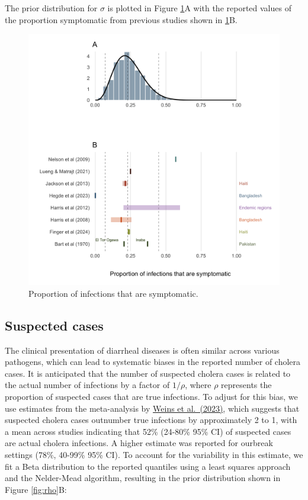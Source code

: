 \documentclass[
]{book}
\begin{document}
The prior distribution for \(\sigma\) is plotted in Figure \ref{fig:symptomatic-fig}A with the reported values of the proportion symptomatic from previous studies shown in \ref{fig:symptomatic-fig}B.

\begin{figure}

\includegraphics[width=1.03\linewidth]{figures/proportion_symptomatic} \hfill{}

\caption{Proportion of infections that are symptomatic.}\label{fig:symptomatic-fig}
\end{figure}

\subsection{Suspected cases}\label{suspected-cases}

The clinical presentation of diarrheal diseases is often similar across various pathogens, which can lead to systematic biases in the reported number of cholera cases. It is anticipated that the number of suspected cholera cases is related to the actual number of infections by a factor of \(1/\rho\), where \(\rho\) represents the proportion of suspected cases that are true infections. To adjust for this bias, we use estimates from the meta-analysis by \href{https://journals.plos.org/plosmedicine/article?id=10.1371/journal.pmed.1004286}{Weins et al.~(2023)}, which suggests that suspected cholera cases outnumber true infections by approximately 2 to 1, with a mean across studies indicating that 52\% (24-80\% 95\% CI) of suspected cases are actual cholera infections. A higher estimate was reported for ourbreak settings (78\%, 40-99\% 95\% CI). To account for the variability in this estimate, we fit a Beta distribution to the reported quantiles using a least squares approach and the Nelder-Mead algorithm, resulting in the prior distribution shown in Figure \ref{fig:rho}B:
\end{document}
